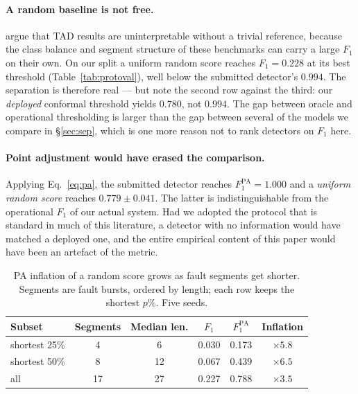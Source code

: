 \documentclass{article}
\begin{document}
\paragraph{A random baseline is not free.} \citet{kim2022towards} argue that
TAD results are uninterpretable without a trivial reference, because the class
balance and segment structure of these benchmarks can carry a large $F_1$ on
their own. On our split a uniform random score reaches $F_1=0.228$ at its best
threshold (Table~\ref{tab:protoval}), well below the submitted detector's
$0.994$. The separation is therefore real --- but note the second row against
the third: our \emph{deployed} conformal threshold yields $0.780$, not $0.994$.
The gap between oracle and operational thresholding is larger than the gap
between several of the models we compare in \S\ref{sec:sep}, which is one more
reason not to rank detectors on $F_1$ here.

\paragraph{Point adjustment would have erased the comparison.} Applying
Eq.~\ref{eq:pa}, the submitted detector reaches $F_1^{\mathrm{PA}}=1.000$ and a
\emph{uniform random score} reaches $0.779\pm0.041$. The latter is
indistinguishable from the operational $F_1$ of our actual system. Had we
adopted the protocol that is standard in much of this literature, a detector
with no information would have matched a deployed one, and the entire empirical
content of this paper would have been an artefact of the metric.

\begin{table}[t]
\centering\small
\caption{PA inflation of a random score grows as fault segments get shorter.
Segments are fault bursts, ordered by length; each row keeps the shortest
$p\%$. Five seeds.}
\label{tab:painflate}
\begin{tabular}{lccccc}
\toprule
Subset & Segments & Median len. & $F_1$ & $F_1^{\mathrm{PA}}$ & Inflation \\
\midrule
shortest 25\% & 4  & 6  & 0.030 & 0.173 & $\times 5.8$ \\
shortest 50\% & 8  & 12 & 0.067 & 0.439 & $\times 6.5$ \\
all           & 17 & 27 & 0.227 & 0.788 & $\times 3.5$ \\
\bottomrule
\end{tabular}
\end{table}
\end{document}

